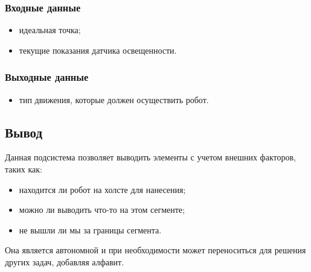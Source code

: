 \subsubsection*{Входные данные}
\begin{itemize}
\item идеальная точка;
\item текущие показания датчика освещенности. 
\end{itemize}

\subsubsection*{Выходные данные}
\begin{itemize}
\item тип движения, которые должен осуществить робот.
\end{itemize}

\subsection{Вывод}

Данная подсистема позволяет выводить элементы с учетом внешних факторов, таких как:
\begin{itemize}
\item находится ли робот на холсте для нанесения;
\item можно ли выводить что-то на этом сегменте;
\item не вышли ли мы за границы сегмента. 
\end{itemize}

Она является автономной и при необходимости может переноситься для решения других задач, добавляя алфавит.

